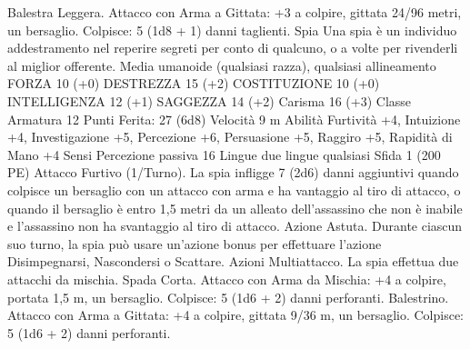 \begin{multicols}{2}
Balestra Leggera. Attacco con Arma a Gittata: +3 a colpire,
gittata 24/96 metri, un bersaglio.
Colpisce: 5 (1d8 + 1) danni taglienti.
Spia
Una spia è un individuo addestramento nel reperire
segreti per conto di qualcuno, o a volte per rivenderli al
miglior offerente.
Media umanoide (qualsiasi razza), qualsiasi allineamento
FORZA 10 (+0)
DESTREZZA 15 (+2)
COSTITUZIONE 10 (+0)
INTELLIGENZA 12 (+1)
SAGGEZZA 14 (+2)
Carisma 16 (+3)
Classe Armatura 12
\hspace*{0pt}\hfill{Punti Ferita}: 27 (6d8)
Velocità 9 m
Abilità Furtività +4, Intuizione +4, Investigazione +5,
Percezione +6, Persuasione +5, Raggiro +5, Rapidità di Mano +4
Sensi Percezione passiva 16
Lingue due lingue qualsiasi
Sfida 1 (200 PE)
Attacco Furtivo (1/Turno). La spia infligge 7 (2d6) danni aggiuntivi
quando colpisce un bersaglio con un attacco con arma e ha vantaggio
al tiro di attacco, o quando il bersaglio è entro 1,5 metri da un alleato
dell’assassino che non è inabile e l’assassino non ha svantaggio al
tiro di attacco.
Azione Astuta. Durante ciascun suo turno, la spia può usare un’azione
bonus per effettuare l’azione Disimpegnarsi, Nascondersi o Scattare.
Azioni
Multiattacco. La spia effettua due attacchi da mischia.
Spada Corta. Attacco con Arma da Mischia: +4 a colpire, portata
1,5 m, un bersaglio.
Colpisce: 5 (1d6 + 2) danni perforanti.
Balestrino. Attacco con Arma a Gittata: +4 a colpire, gittata 9/36
m, un bersaglio. Colpisce: 5 (1d6 + 2) danni perforanti.
 

\end{multicols}
